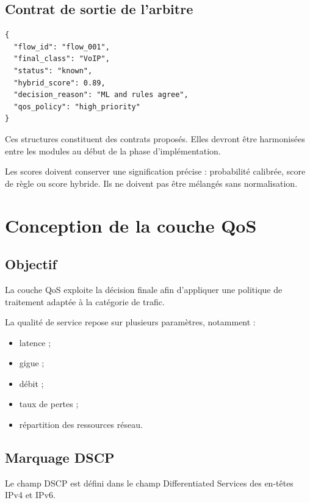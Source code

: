 \subsection{Contrat de sortie de l'arbitre}

\begin{verbatim}
{
  "flow_id": "flow_001",
  "final_class": "VoIP",
  "status": "known",
  "hybrid_score": 0.89,
  "decision_reason": "ML and rules agree",
  "qos_policy": "high_priority"
}
\end{verbatim}

Ces structures constituent des contrats proposés.
Elles devront être harmonisées entre les modules
au début de la phase d'implémentation.

Les scores doivent conserver une signification précise :
probabilité calibrée, score de règle ou score hybride.
Ils ne doivent pas être mélangés sans normalisation.

\section{Conception de la couche QoS}

\subsection{Objectif}

La couche QoS exploite la décision finale afin
d'appliquer une politique de traitement adaptée
à la catégorie de trafic.

La qualité de service repose sur plusieurs paramètres,
notamment :

\begin{itemize}
    \item latence ;
    \item gigue ;
    \item débit ;
    \item taux de pertes ;
    \item répartition des ressources réseau.
\end{itemize}

\subsection{Marquage DSCP}

Le champ DSCP est défini dans le champ Differentiated
Services des en-têtes IPv4 et IPv6.

